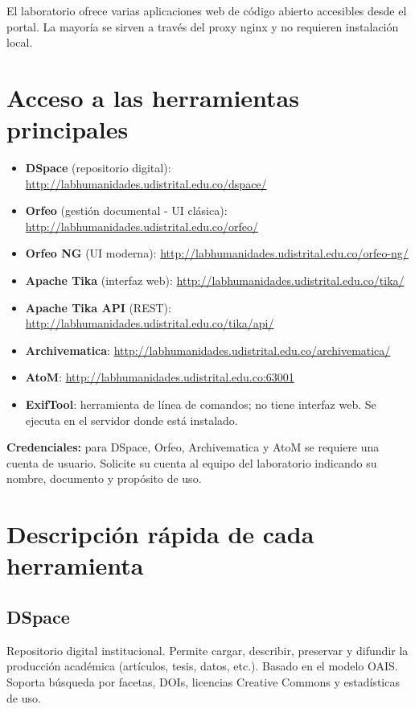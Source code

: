 \documentclass[12pt,a4paper]{report}
\begin{document}
El laboratorio ofrece varias aplicaciones web de código abierto accesibles
desde el portal. La mayoría se sirven a través del proxy nginx y no requieren
instalación local.

\section{Acceso a las herramientas principales}

\begin{itemize}
  \item \textbf{DSpace} (repositorio digital):
        \url{http://labhumanidades.udistrital.edu.co/dspace/}
  \item \textbf{Orfeo} (gestión documental - UI clásica):
        \url{http://labhumanidades.udistrital.edu.co/orfeo/}
  \item \textbf{Orfeo NG} (UI moderna):
        \url{http://labhumanidades.udistrital.edu.co/orfeo-ng/}
  \item \textbf{Apache Tika} (interfaz web):
        \url{http://labhumanidades.udistrital.edu.co/tika/}
  \item \textbf{Apache Tika API} (REST):
        \url{http://labhumanidades.udistrital.edu.co/tika/api/}
  \item \textbf{Archivematica}:
        \url{http://labhumanidades.udistrital.edu.co/archivematica/}
  \item \textbf{AtoM}:
        \url{http://labhumanidades.udistrital.edu.co:63001}
  \item \textbf{ExifTool}: herramienta de línea de comandos; no tiene interfaz
        web. Se ejecuta en el servidor donde está instalado.
\end{itemize}

\begin{mdframed}[style=importantstyle]
  \textbf{Credenciales:} para DSpace, Orfeo, Archivematica y AtoM se requiere
  una cuenta de usuario. Solicite su cuenta al equipo del laboratorio
  indicando su nombre, documento y propósito de uso.
\end{mdframed}

\section{Descripción rápida de cada herramienta}

\subsection{DSpace}
Repositorio digital institucional. Permite cargar, describir, preservar y
difundir la producción académica (artículos, tesis, datos, etc.). Basado en
el modelo OAIS. Soporta búsqueda por facetas, DOIs, licencias Creative
Commons y estadísticas de uso.
\end{document}
